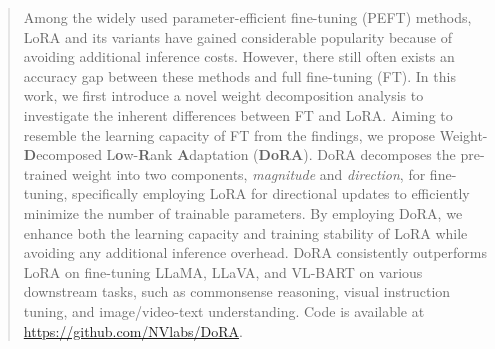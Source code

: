 \documentclass{article}
\newcommand{\ours}{DoRA}
\theoremstyle{plain}
\theoremstyle{definition}
\theoremstyle{remark}
\def\authornote#1#2#3{{\textcolor{#2}{\textsl{\small[#1: #3]}}}}
\newcommand{\PM}[1]{\authornote{Pavlo}{blue}{#1}}
\begin{document}
\begin{abstract}
Among the widely used parameter-efficient fine-tuning (PEFT) methods, LoRA and its variants have gained considerable popularity because of avoiding additional inference costs. However, there still often exists an accuracy gap between these methods and full fine-tuning (FT). In this work, we first introduce a novel weight decomposition analysis to investigate the inherent differences between FT and LoRA. Aiming to resemble the learning capacity of FT from the findings,
we propose Weight-\textbf{D}ecomposed L\textbf{o}w-\textbf{R}ank \textbf{A}daptation (\textbf{DoRA}). DoRA decomposes the pre-trained weight into two components, \textit{magnitude} and \textit{direction}, for fine-tuning, specifically employing LoRA for directional updates to efficiently minimize the number of trainable parameters. By employing DoRA, we enhance both the learning capacity and training stability of LoRA while avoiding any additional inference overhead. DoRA consistently outperforms LoRA on fine-tuning LLaMA, LLaVA, and VL-BART on various downstream tasks, such as commonsense reasoning, visual instruction tuning, and image/video-text understanding. Code is available at \url{https://github.com/NVlabs/DoRA}.

\end{abstract}
\end{document}
